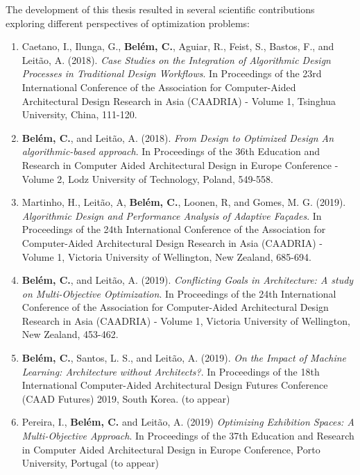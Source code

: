 The development of this thesis resulted in several scientific contributions exploring different perspectives of optimization problems:

\begin{enumerate}
\item Caetano, I., Ilunga, G., \textbf{Belém, C.}, Aguiar, R., Feist, S., Bastos, F., and Leitão, A. (2018). \textit{Case Studies on the Integration of Algorithmic Design Processes in Traditional Design Workflows}. In Proceedings of the 23rd International Conference of the Association for Computer-Aided Architectural Design Research in Asia (CAADRIA) - Volume 1, Tsinghua University, China, 111-120.

\item \textbf{Belém, C.}, and Leitão, A. (2018). \textit{From Design to Optimized Design An algorithmic-based approach}. In Proceedings of the 36th Education and Research in Computer Aided Architectural Design in Europe Conference - Volume 2, Lodz University of Technology, Poland, 549-558.

\item Martinho, H., Leitão, A, \textbf{Belém, C.}, Loonen, R, and Gomes, M. G. (2019). \textit{Algorithmic Design and Performance Analysis of Adaptive Façades}. In Proceedings of the 24th International Conference of the Association for Computer-Aided Architectural Design Research in Asia (CAADRIA) - Volume 1, Victoria University of Wellington, New Zealand, 685-694.

\item \textbf{Belém, C.}, and Leitão, A. (2019). \textit{Conflicting Goals in Architecture: A study on Multi-Objective Optimization}. In Proceedings of the 24th International Conference of the Association for Computer-Aided Architectural Design Research in Asia (CAADRIA) - Volume 1, Victoria University of Wellington, New Zealand, 453-462.

\item \textbf{Belém, C.}, Santos, L. S., and Leitão, A. (2019). \textit{On the Impact of Machine Learning: Architecture without Architects?}. In Proceedings of the 18th International Computer-Aided Architectural Design Futures Conference (CAAD Futures) 2019, South Korea. (to appear)

\item Pereira, I., \textbf{Belém, C.} and Leitão, A. (2019) \textit{Optimizing Exhibition Spaces: A Multi-Objective Approach}. In Proceedings of the 37th Education and Research in Computer Aided Architectural Design in Europe Conference, Porto University, Portugal (to appear)

\end{enumerate}



